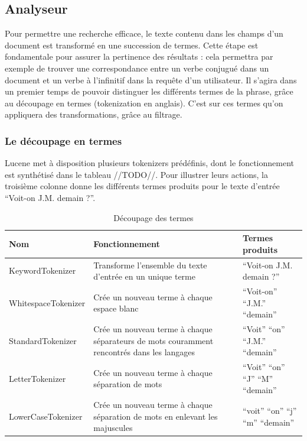 \subsection{Analyseur}

Pour permettre une recherche efficace, le texte contenu dans les champs d’un document est transformé en une succession de termes. Cette étape est fondamentale pour assurer la pertinence des résultats : cela permettra par exemple de trouver une correspondance entre un verbe conjugué dans un document et un verbe à l’infinitif dans la requête d’un utilisateur. Il s’agira dans un premier temps de pouvoir distinguer les différents termes de la phrase, grâce au découpage en termes (tokenization en anglais). C’est sur ces termes qu’on appliquera des transformations, grâce au filtrage.

\subsubsection{Le découpage en termes}

Lucene met à disposition plusieurs tokenizers prédéfinis, dont le fonctionnement est synthétisé dans le tableau //TODO//. Pour illustrer leurs actions, la troisième colonne donne les différents termes produits pour le texte d’entrée “Voit-on J.M. demain ?”.
 
            \begin{table}[!htbp]
                \centering
                \begin{tabular}{|p{4.5cm}|p{4.5cm}|p{4.5cm}|}
                    \hline
                    \textbf{Nom} & \textbf{Fonctionnement} & \textbf{Termes produits}\\
                    \hline
                    KeywordTokenizer & Transforme l’ensemble du texte d’entrée en un unique terme & “Voit-on J.M. demain ?”\\
		\hline
                    WhitespaceTokenizer & Crée un nouveau terme à chaque espace blanc & “Voit-on” “J.M.” “demain”\\
		\hline
                    StandardTokenizer & Crée un nouveau terme à chaque séparateurs de mots couramment rencontrés dans les langages & “Voit” “on” “J.M.” “demain”\\
		\hline
                    LetterTokenizer & Crée un nouveau terme à chaque séparation de mots & “Voit” “on” “J” “M” “demain”\\
		\hline
                    LowerCaseTokenizer & Crée un nouveau terme à chaque séparation de mots en enlevant les majuscules & “voit” “on” “j” “m” “demain”\\
                    \hline

                \end{tabular}
                \caption{Découpage des termes}
                \label{tab:decoupage_termes}
            \end{table}

